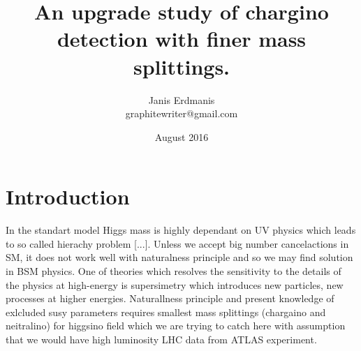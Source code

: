 \documentclass[tightenline,notitlepage,nofootinbib]{revtex4-1}
\begin{document}
  \title{An upgrade study of chargino detection with finer mass splittings.}
  \author{Janis Erdmanis \\ graphitewriter@gmail.com}
  \date{August 2016}
  \maketitle

  \section{Introduction}

  In the standart model Higgs mass is highly dependant on UV physics which leads to so called hierachy problem [...]. Unless we accept big number cancelactions in SM, it does not work well with naturalness principle and so we may find solution in BSM physics. One of theories which resolves the sensitivity to the details of the physics at high-energy is supersimetry which introduces new particles, new processes at higher energies. Naturallness principle and present knowledge of exlcluded susy parameters requires smallest mass splittings (chargaino and neitralino) for higgsino field which we are trying to catch here with assumption that we would have high luminosity LHC data from ATLAS experiment.
\end{document}
